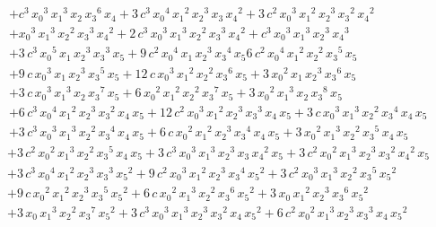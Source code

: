 \begin{thm}
\begin{eqnarray*}
&& + 
  c^3\,{{x_0}}^3\,{{x_1}}^3\,{x_2}\,{{x_3}}^6\,{x_4}
+ 3\,c^3\,{{x_0}}^4\,{{x_1}}^2\,
{{x_2}}^3\,{x_3}\,{{x_4}}^2 + 3\,c^2\,{{x_0}}^3\,{{x_1}}^2\,{{x_2}}^3\,{{x_3}}^2\,{{x_4}}^2\\
&& + 
 {{x_0}}^3\,{{x_1}}^3\,{{x_2}}^2\,{{x_3}}^3\,{{x_4}}^2 + 
2\,c^3\,{{x_0}}^3\,{{x_1}}^3\,{{x_2}}^2\,
{{x_3}}^3\,{{x_4}}^2
 +  c^3\,{{x_0}}^3\,{{x_1}}^3\,{{x_2}}^3\,{{x_4}}^3\\
&&+3\,c^3\,{{x_0}}^5\,{x_1}\,{{x_2}}^3\,{{x_3}}^3\,{x_5} + 
   9\,c^2\,{{x_0}}^4\,{x_1}\,{{x_2}}^3\,{{x_3}}^4\,{x_5} 
 6\,c^2\,{{x_0}}^4\,{{x_1}}^2\,{{x_2}}^2\,
{{x_3}}^5\,{x_5}\\
&& + 9\,c\,{{x_0}}^3\,{x_1}\,{{x_2}}^3\,{{x_3}}^5\,{x_5} + 
12\,c\,{{x_0}}^3\,{{x_1}}^2\,{{x_2}}^2\,{{x_3}}^6\,{x_5} 
+  3\,{{x_0}}^2\,{x_1}\,{{x_2}}^3\,{{x_3}}^6\,{x_5}\\
&& + 3\,c\,{{x_0}}^3\,{{x_1}}^3\,{x_2}\,{{x_3}}^7\,{x_5} + 
  6\,{{x_0}}^2\,{{x_1}}^2\,{{x_2}}^2\,{{x_3}}^7\,{x_5} + 
      3\,{{x_0}}^2\,{{x_1}}^3\,{x_2}\,{{x_3}}^8\,{x_5} \\
&&+6\,c^3\,{{x_0}}^4\,{{x_1}}^2\,{{x_2}}^3\,
{{x_3}}^2\,{x_4}\, {x_5} 
+ 12\,c^2\,{{x_0}}^3\,{{x_1}}^2\,{{x_2}}^3\,{{x_3}}^3\,
  {x_4}\,{x_5} + 3\,c\,{{x_0}}^3\,{{x_1}}^3\,{{x_2}}^2\,
       {{x_3}}^4\,{x_4}\,{x_5} \\
&&+3\,c^3\,{{x_0}}^3\,{{x_1}}^3\,{{x_2}}^2\,
{{x_3}}^4\,{x_4}\,{x_5} 
+ 6\,c\,{{x_0}}^2\,{{x_1}}^2\,{{x_2}}^3\,{{x_3}}^4\,
{x_4}\,{x_5} + 3\,{{x_0}}^2\,{{x_1}}^3\,{{x_2}}^2\,
       {{x_3}}^5\,{x_4}\,{x_5}
\end{eqnarray*}
\begin{eqnarray*}
&& + 3\,c^2\,{{x_0}}^2\,{{x_1}}^3\,
{{x_2}}^2\,{{x_3}}^5\,{x_4}\,
       {x_5} + 3\,c^3\,{{x_0}}^3\,
{{x_1}}^3\,{{x_2}}^3\,{x_3}\,
{{x_4}}^2\,{x_5} + 3\,c^2\,{{x_0}}^2\,
{{x_1}}^3\,{{x_2}}^3\,
{{x_3}}^2\,{{x_4}}^2\,{x_5} \\
&&+  3\,c^3\,{{x_0}}^4\,{{x_1}}^2\,
{{x_2}}^3\,{{x_3}}^3\,{{x_5}}^2 + 
 9\,c^2\,{{x_0}}^3\,{{x_1}}^2\,{{x_2}}^3\,
{{x_3}}^4\,{{x_5}}^2 + 
 3\,c^2\,{{x_0}}^3\,{{x_1}}^3\,
{{x_2}}^2\,{{x_3}}^5\,{{x_5}}^2 \\
&&+ 9\,c\,{{x_0}}^2\,{{x_1}}^2\,{{x_2}}^3\,
{{x_3}}^5\,{{x_5}}^2 + 
 6\,c\,{{x_0}}^2\,{{x_1}}^3\,{{x_2}}^2\,{{x_3}}^6\,{{x_5}}^2 + 
3\,{x_0}\,{{x_1}}^2\,{{x_2}}^3\,{{x_3}}^6\,{{x_5}}^2 \\
&&+ 3\,{x_0}\,{{x_1}}^3\,{{x_2}}^2\,{{x_3}}^7\,{{x_5}}^2 
+3\,c^3\,{{x_0}}^3\,{{x_1}}^3\,{{x_2}}^3\,
{{x_3}}^2\,{x_4}\,{{x_5}}^2 + 
6\,c^2\,{{x_0}}^2\,{{x_1}}^3\,{{x_2}}^3\,{{x_3}}^3\,
   {x_4}\,{{x_5}}^2\\

\end{eqnarray*}
\end{thm}
